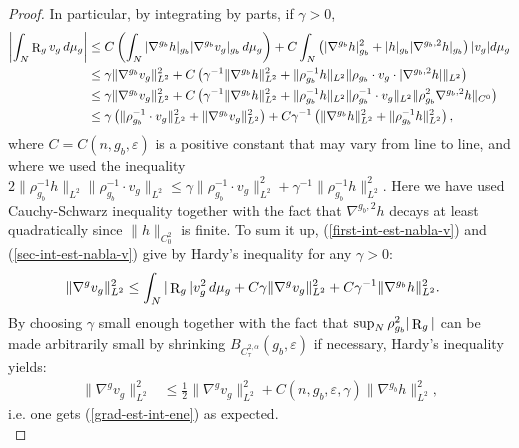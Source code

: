 \documentclass[a4paper,11pt,reqno]{amsart}
\def\R{\mathop{\rm R}\nolimits}
\numberwithin{equation}{section}
\begin{document}
\begin{proof}
		In particular, by integrating by parts, if $\gamma>0$,
		\begin{equation}
		\begin{split}
		\left|\int_N\R_gv_g\,d\mu_g\right|&\leq C\left(\int_N|\nabla^{g_b}h|_{g_b}|\nabla^{g_b}v_g|_{g_b}\,d\mu_g\right)+C\int_N\left(|\nabla^{g_b}h|^2_{g_b}+|h|_{g_b}|\nabla^{g_b,2}h|_{g_b}\right)|v_g|d\mu_g\\
		&\leq\gamma\|\nabla^{g_b}v_g\|_{L^2}^2+C\left(\gamma^{-1}\|\nabla^{g_b}h\|_{L^2}^2+\|\rho_{g_b}^{-1}h\|_{L^2}\|\rho_{g_b}\cdot v_g\cdot |\nabla^{g_b,2}h|\|_{L^2}\right)\\
		&\leq \gamma\|\nabla^{g_b}v_g\|_{L^2}^2+C\left(\gamma^{-1}\|\nabla^{g_b}h\|_{L^2}^2+\|\rho_{g_b}^{-1}h\|_{L^2}\|\rho_{g_b}^{-1}\cdot v_g\|_{L^2}\|\rho_{g_b}^2\nabla^{g_b,2}h\|_{C^0}\right)\\
		&\leq \gamma\left(\|\rho_{g_b}^{-1}\cdot v_g\|_{L^2}^2+\|\nabla^{g_b}v_g\|_{L^2}^2\right)+C\gamma^{-1}\left(\|\nabla^{g_b}h\|_{L^2}^2+\|\rho_{g_b}^{-1}h\|_{L^2}^2\right),
		\label{sec-int-est-nabla-v}
		\end{split}
		\end{equation}
		where $C=C(n,g_b,\varepsilon)$ is a positive constant that may vary from line to line, and where we used the inequality $2\|\rho_{g_b}^{-1}h\|_{L^2}\|\rho_{g_b}^{-1}\cdot v_g\|_{L^2}\leq \gamma\|\rho_{g_b}^{-1}\cdot v_g\|_{L^2}^2+\gamma^{-1}\|\rho_{g_b}^{-1}h\|_{L^2}^2$. Here we have used Cauchy-Schwarz inequality together with the fact that $\nabla^{g_b,2}h$ decays at least quadratically since $\|h\|_{C^2_0}$ is finite. To sum it up, (\ref{first-int-est-nabla-v}) and (\ref{sec-int-est-nabla-v}) give by Hardy's inequality for any $\gamma>0$:
		\begin{equation*}
		\begin{split}
		\|\nabla^gv_g\|^2_{L^2}&\leq\int_N|\R_g|v_g^2\,d\mu_g+C\gamma\|\nabla^gv_g\|_{L^2}^2+C\gamma^{-1}\|\nabla^{g_b}h\|_{L^2}^2.
		\end{split}
		\end{equation*}
		By choosing $\gamma$ small enough together with the fact that $\sup_{N}\rho^2_{g_b}|\R_g|$ can be made arbitrarily small by shrinking $B_{C^{2,\alpha}_{\tau}}(g_b,\varepsilon)$ if necessary, Hardy's inequality yields:
		\begin{equation}
		\begin{split}\label{est-grad-pot-fct-ene}
		\|\nabla^gv_g\|^2_{L^2}&\leq\frac{1}{2}\|\nabla^gv_g\|^2_{L^2}+C(n,g_b,\varepsilon,\gamma)\|\nabla^{g_b}h\|_{L^2}^2,
		\end{split}
		\end{equation}
		i.e. one gets (\ref{grad-est-int-ene}) as expected.
		\\
		

\end{proof}
\end{document}
